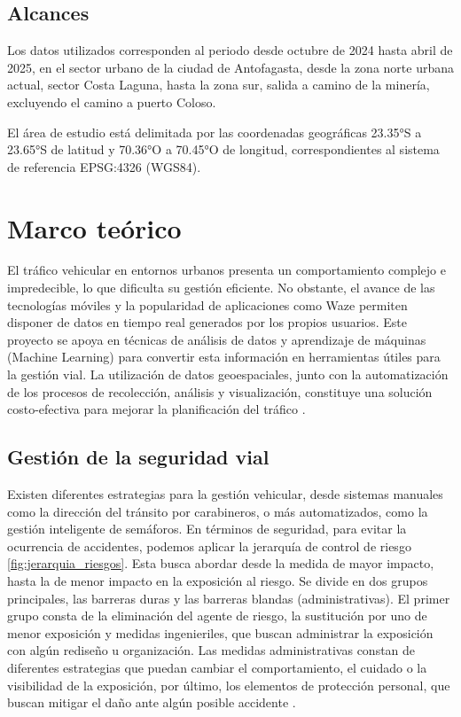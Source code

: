 \documentclass[12pt]{article}
\begin{document}
\subsection{Alcances}

Los datos utilizados corresponden al periodo desde octubre de 2024 hasta abril de 2025, en el sector urbano de la ciudad de Antofagasta, desde la zona norte urbana actual, sector Costa Laguna, hasta la zona sur, salida a camino de la minería, excluyendo el camino a puerto Coloso.

El área de estudio está delimitada por las coordenadas geográficas 23.35°S a 23.65°S de latitud y 70.36°O a 70.45°O de longitud, correspondientes al sistema de referencia EPSG:4326 (WGS84).

\section{Marco teórico}

El tráfico vehicular en entornos urbanos presenta un comportamiento complejo e impredecible, lo que dificulta su gestión eficiente. No obstante, el avance de las tecnologías móviles y la popularidad de aplicaciones como Waze permiten disponer de datos en tiempo real generados por los propios usuarios. Este proyecto se apoya en técnicas de análisis de datos y aprendizaje de máquinas (Machine Learning) para convertir esta información en herramientas útiles para la gestión vial. La utilización de datos geoespaciales, junto con la automatización de los procesos de recolección, análisis y visualización, constituye una solución costo-efectiva para mejorar la planificación del tráfico \citep{barcelo2005}.

\subsection{Gestión de la seguridad vial}

Existen diferentes estrategias para la gestión vehicular, desde sistemas manuales como la dirección del tránsito por carabineros, o más automatizados, como la gestión inteligente de semáforos. En términos de seguridad, para evitar la ocurrencia de accidentes, podemos aplicar la jerarquía de control de riesgo \cref{fig:jerarquia_riesgos}. Esta busca abordar desde la medida de mayor impacto, hasta la de menor impacto en la exposición al riesgo. Se divide en dos grupos principales, las barreras duras y las barreras blandas (administrativas). El primer grupo consta de la eliminación del agente de riesgo, la sustitución por uno de menor exposición y medidas ingenieriles, que buscan administrar la exposición con algún rediseño u organización. Las medidas administrativas constan de diferentes estrategias que puedan cambiar el comportamiento, el cuidado o la visibilidad de la exposición, por último, los elementos de protección personal, que buscan mitigar el daño ante algún posible accidente \citep{niosh2024}.
\end{document}
